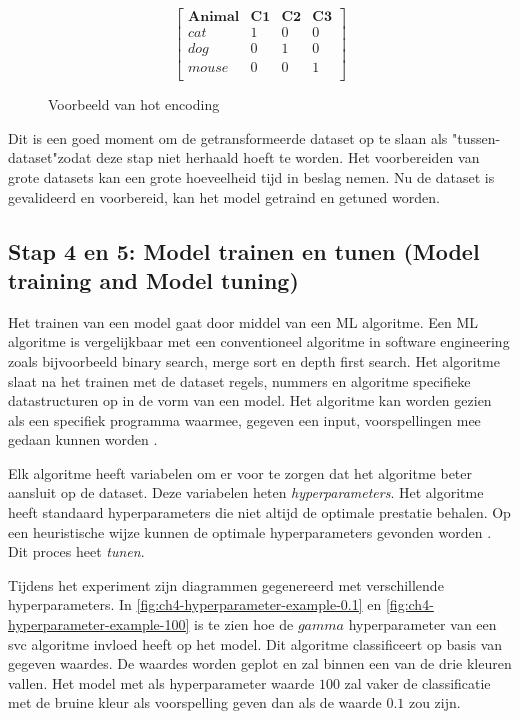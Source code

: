 \begin{figure}[hbt!]
  \centering
  $$\begin{bmatrix}
    \textbf{Animal} & \textbf{C1} & \textbf{C2} & \textbf{C3}\\
    cat & 1 & 0 & 0 \\
    dog & 0 & 1 & 0 \\
    mouse & 0 & 0 & 1 \\
  \end{bmatrix}$$
  \label{fig:ch4-hot-encoding-example}
  \caption{Voorbeeld van hot encoding}
\end{figure}

Dit is een goed moment om de getransformeerde dataset op te slaan als "tussen-dataset"\space zodat deze stap niet herhaald hoeft te worden. Het voorbereiden van grote datasets kan een grote hoeveelheid tijd in beslag nemen. Nu de dataset is gevalideerd en voorbereid, kan het model getraind en getuned worden.

\subsection{Stap 4 en 5: Model trainen en tunen (Model training and Model tuning)}\label{subsec:ch4-model-trainen-en-tunen}
Het trainen van een model gaat door middel van een ML algoritme. Een ML algoritme is vergelijkbaar met een conventioneel algoritme in software engineering zoals bijvoorbeeld binary search, merge sort en depth first search. Het algoritme slaat na het trainen met de dataset regels, nummers en algoritme specifieke datastructuren op in de vorm van een model. Het algoritme kan worden gezien als een specifiek programma waarmee, gegeven een input, voorspellingen mee gedaan kunnen worden \cite{ml-algorithm-model-difference}.

Elk algoritme heeft variabelen om er voor te zorgen dat het algoritme beter aansluit op de dataset. Deze variabelen heten \textit{hyperparameters}. Het algoritme heeft standaard hyperparameters die niet altijd de optimale prestatie behalen. Op een heuristische wijze kunnen de optimale hyperparameters gevonden worden \cite{ml-model-hyper-parameter-brownlee}. Dit proces heet \textit{tunen}.

Tijdens het experiment zijn diagrammen gegenereerd met verschillende hyperparameters. In \autoref{fig:ch4-hyperparameter-example-0.1} en \autoref{fig:ch4-hyperparameter-example-100} is te zien hoe de \(gamma\) hyperparameter van een \acrfull{svc} algoritme invloed heeft op het model. Dit algoritme classificeert op basis van gegeven waardes. De waardes worden geplot en zal binnen een van de drie kleuren vallen. Het model met als hyperparameter waarde \(100\) zal vaker de classificatie met de bruine kleur als voorspelling geven dan als de waarde \(0.1\) zou zijn.


